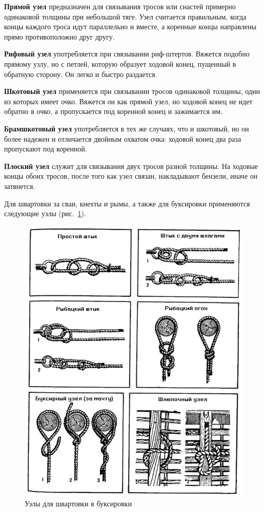 \documentclass[a4paper, 12pt, twoside, final]{scrbook}
\begin{document}
\textbf{Прямой узел} предназначен для связывания тросов или снастей примерно одинаковой толщины при небольшой тяге. Узел считается правильным, когда концы каждого троса идут параллельно и вместе, а коренные концы направлены прямо противоположно друг другу.

\textbf{Рифовый узел} употребляется при связывании риф-штертов. Вяжется подобно прямому узлу, но с петлей, которую образует ходовой конец, пущенный в обратную сторону. Он легко и быстро раздается.

\textbf{Шкотовый узел} применяется при связывании тросов одинаковой толщины, один из которых имеет очко. Вяжется он как прямой узел, но ходовой конец не идет обратно в очко, а пропускается под коренной конец и зажимается им.

\textbf{Брамшкотовый узел} употребляется в тех же случаях, что и шкотовый, но он более надежен и отличается двойным охватом очка: ходовой конец два раза пропускают под коренной.

\textbf{Плоский узел} служит для связывания двух тросов разной толщины. На ходовые концы обоих тросов, после того как узел связан, накладывают бензели, иначе он затянется. 

Для швартовки за сваи, кнехты и рымы, а также для буксировки применяются следующие узлы (рис.~\ref{fig:60}).

\begin{figure}[htbp]
   \centering
   \includegraphics{60_Uzly} %
   \caption{Узлы для швартовки в буксировки}
   \label{fig:60}
\end{figure}
\end{document}

